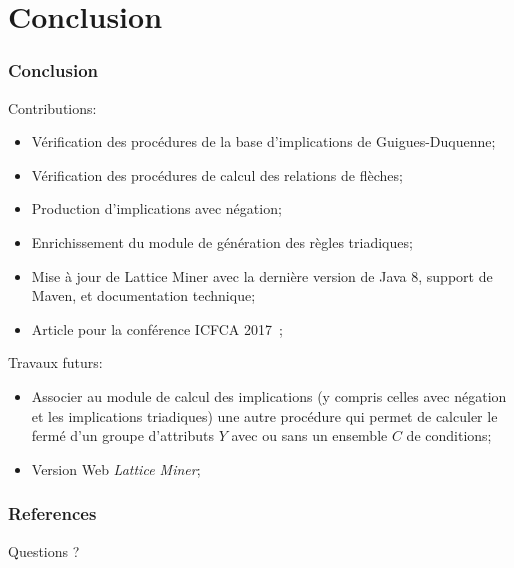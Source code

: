 \documentclass[french]{beamer}
\begin{document}
\section{Conclusion}
\begin{frame}
\frametitle{Conclusion}
Contributions:
\begin{itemize}
\item Vérification des procédures de la base d'implications de Guigues-Duquenne;
\item Vérification des procédures de calcul des relations de flèches;
\item Production d'implications avec négation;
\item Enrichissement du module de génération des règles triadiques;
\item Mise à jour de Lattice Miner avec la dernière version de Java 8, support de Maven, et documentation technique;
\item Article pour la conférence ICFCA 2017~\parencite{Missaoui2017};
\end{itemize}
Travaux futurs:
\begin{itemize}
\item Associer au module de calcul des implications (y compris celles avec négation et les implications triadiques) une autre procédure qui permet de calculer le fermé d'un groupe d'attributs $Y$ avec ou sans un ensemble $C$ de conditions;
\item Version Web \emph{Lattice Miner};
\end{itemize}
\end{frame}
\begin{frame}[allowframebreaks]
\frametitle{References}
\printbibliography
\end{frame}
\begin{frame}
\Huge{\centerline{Questions ?}}
\end{frame}
\end{document}
